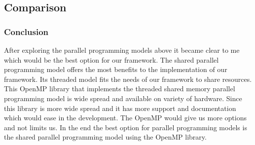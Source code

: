 \subsection{Comparison}
\subsubsection{Conclusion}
After exploring the parallel programming models above it became clear to me which would be the best option for our framework. The shared parallel programming model offers the most benefits to the implementation of our framework. Its threaded model fits the needs of our framework to share resources. This OpenMP library that implements the threaded shared memory parallel programming model is wide spread and available on variety of hardware. Since this library is more wide spread and it has more support and documentation which would ease in the development. The OpenMP would give us more options and not limits us. In the end the best option for parallel programming models is the shared parallel programming model using the OpenMP library.

